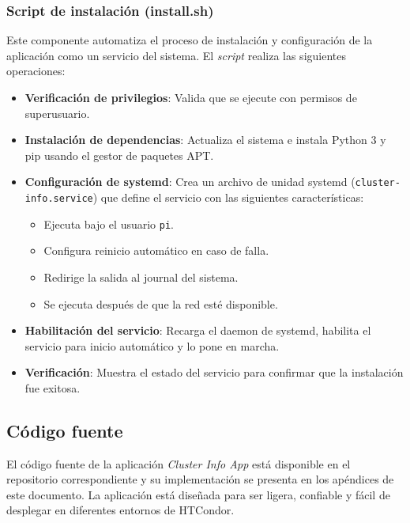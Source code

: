 \subsubsection{Script de instalación (install.sh)}
\noindent

Este componente automatiza el proceso de instalación y configuración de la aplicación como un servicio del sistema. El \textit{script} realiza las siguientes operaciones:

\begin{itemize}
	\item \textbf{Verificación de privilegios}: Valida que se ejecute con permisos de superusuario.
	
	\item \textbf{Instalación de dependencias}: Actualiza el sistema e instala Python 3 y pip usando el gestor de paquetes APT.
	
	\item \textbf{Configuración de systemd}: Crea un archivo de unidad systemd (\texttt{cluster-info.service}) que define el servicio con las siguientes características:
	\begin{itemize}
		\item Ejecuta bajo el usuario \texttt{pi}.
		\item Configura reinicio automático en caso de falla.
		\item Redirige la salida al journal del sistema.
		\item Se ejecuta después de que la red esté disponible.
	\end{itemize}
	
	\item \textbf{Habilitación del servicio}: Recarga el daemon de systemd, habilita el servicio para inicio automático y lo pone en marcha.
	
	\item \textbf{Verificación}: Muestra el estado del servicio para confirmar que la instalación fue exitosa.
\end{itemize}

\subsection{Código fuente}
\noindent

El código fuente de la aplicación \textit{Cluster Info App} está disponible en el repositorio correspondiente y su implementación se presenta en los apéndices de este documento. La aplicación está diseñada para ser ligera, confiable y fácil de desplegar en diferentes entornos de HTCondor.

